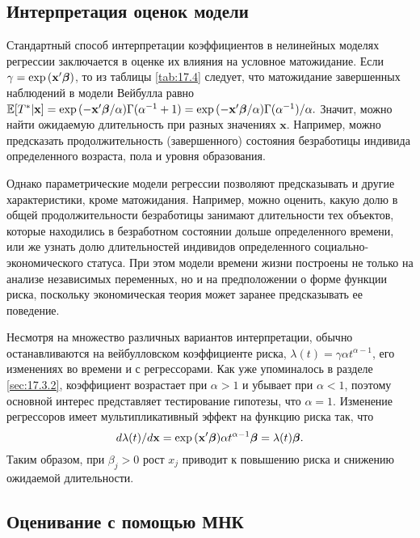 \subsection{Интерпретация оценок модели}\label{sec:17.6.6}

\noindent
Стандартный способ интерпретации коэффициентов в нелинейных моделях регрессии заключается в оценке их влияния на условное матожидание. Если $\gamma=\exp{(\mathbf{x}'\bm{\beta})}$, то из таблицы \ref{tab:17.4} следует, что матожидание завершенных наблюдений в модели Вейбулла равно $\mathbb{E}[T^*|\mathbf{x}]=\exp{(-\mathbf{x}'\bm{\beta}/\alpha)}\Gamma(\alpha^{-1}+1)=\exp{(-\mathbf{x}'\bm{\beta}/\alpha)}\Gamma(\alpha^{-1})/\alpha.$ Значит, можно найти ожидаемую длительность при разных значениях $\mathbf{x}$. Например, можно предсказать продолжительность (завершенного) состояния безработицы индивида определенного возраста, пола и уровня образования.

Однако параметрические модели регрессии позволяют предсказывать и другие характеристики, кроме матожидания. Например, можно оценить, какую долю в общей продолжительности безработицы занимают длительности тех объектов, которые находились в безработном состоянии дольше определенного времени, или же узнать долю длительностей индивидов определенного социально-экономического статуса. %
При этом модели времени жизни построены не только на анализе независимых переменных, но и на предположении о форме функции риска, поскольку экономическая теория может заранее предсказывать ее поведение.

Несмотря на множество различных вариантов интерпретации, обычно останавливаются %
на вейбулловском коэффициенте риска, $\lambda(t)=\gamma\alpha t^{\alpha-1}$, его изменениях во времени и с регрессорами. Как уже упоминалось в разделе \ref{sec:17.3.2}, коэффициент возрастает при $\alpha>1$ и убывает при $\alpha<1$, поэтому основной интерес представляет тестирование гипотезы, что $\alpha=1$. Изменение регрессоров имеет мультипликативный эффект на функцию риска так, что
        $$d\lambda(t)/d\mathbf{x}=\exp{(\mathbf{x}'\bm{\beta})}\alpha t^{\alpha-1}\bm{\beta}=\lambda(t)\bm{\beta}.$$
Таким образом, при $\beta_j>0$ рост $x_j$ приводит к повышению риска и снижению ожидаемой длительности. %


\subsection{Оценивание с помощью МНК}\label{sec:17.6.7}

